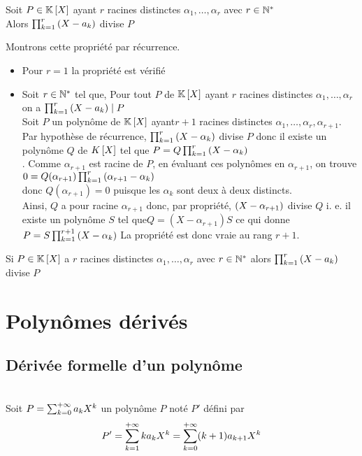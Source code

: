 \begin{defprop}
    Soit \(P \in  \mathbb{K} \left[X\right]\) ayant \(r\) racines distinctes \(\alpha_1, \dots , \alpha_r\) avec \(r \in \mathbb{N}^*\)\\
    Alors \(\prod_{k=1}^{r} \left(X-a_k\right)\) divise \(P\)
\end{defprop}

\begin{dem}
    Montrons cette propriété par récurrence.
    \begin{itemize}
        \item Pour \(r=1\) la propriété est vérifié
        \item Soit \(r \in \mathbb{N}^*\) tel que, Pour tout \(P\) de \(\mathbb{K}\left[X\right]\) ayant \(r\) racines distinctes \(\alpha_1, \dots , \alpha_r\) on a \(\prod_{k=1}^{r} \left(X-a_k\right) \mid P\)\\
        Soit \(P\) un polynôme de \(\mathbb{K}\left[X\right]\) ayant\(r+1\) racines distinctes \(\alpha_1,\dots,\alpha_r,\alpha_{r+1}\).
        Par hypothèse de récurrence, \(\prod_{k=1}^r \left(X-\alpha_k\right)\) divise \(P\) donc il existe un polynôme \(Q\) de \(K \left[X\right]\) tel que \(P = Q \prod_{k=1}^{r}\left(X-\alpha_k\right)\) \\.
        Comme \(\alpha_{r+1}\) est racine de \(P\), en évaluant ces polynômes en \(\alpha_{r+1}\), on trouve \(0 = Q(\alpha_{r+1})\prod_{k=1}^r \left(\alpha_{r+1}-\alpha_k\right)\)\\
        donc \(Q(\alpha_{r+1}) = 0\) puisque les \(\alpha_k\) sont deux à deux distincts.\\
        Ainsi, \(Q\) a pour racine \(\alpha_{r+1}\) donc, par propriété, \(\left(X-\alpha_{r+1}\right)\) divise \(Q\) i. e. il existe un
        polynôme \(S\) tel que\( Q = (X - \alpha _{r+1}) S\) ce qui donne \(P = S \prod_{k=1}^{r+1}\left(X-\alpha_k\right)\)
        La propriété est donc vraie au rang \(r + 1\).
    \end{itemize}
    \conclusion Si \(P \in \mathbb{K} \left[X\right]\) a \(r\) racines distinctes \(\alpha_1, \dots , \alpha_r\) avec \(r \in \mathbb{N}^*\) alors \(\prod_{k=1}^{r} \left(X-a_k\right)\) divise \(P\)
\end{dem}
\section{Polynômes dérivés}
\subsection{Dérivée formelle d'un polynôme}
\begin{defi}
    ~\\
    Soit \(P =  \sum_{k=0}^{+\infty} a_k X^k\) un polynôme \(P\) noté \(P'\) défini par 
    \[P' = \sum_{k=1}^{+\infty} k a_k X^k = \sum_{k=0}^{+\infty} (k+1) a_{k+1}X^k\] 
\end{defi}

